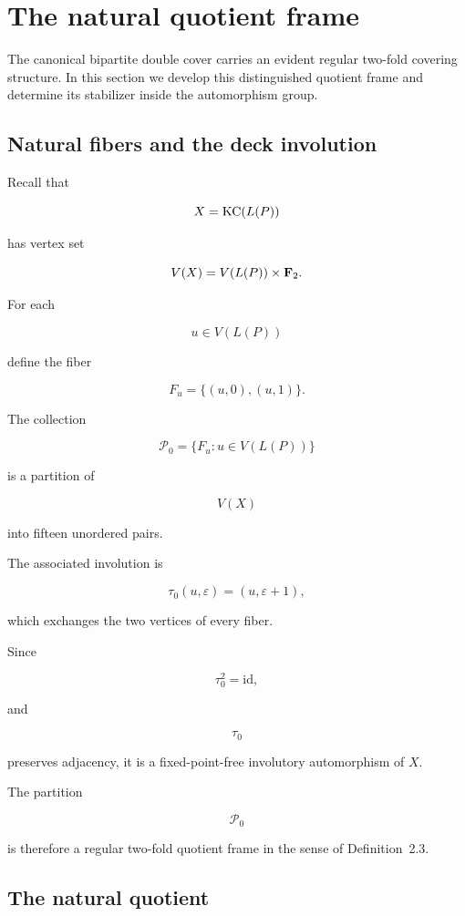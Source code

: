 \section{The natural quotient frame}

The canonical bipartite double cover carries an evident regular two-fold
covering structure. In this section we develop this distinguished quotient
frame and determine its stabilizer inside the automorphism group.

\subsection{Natural fibers and the deck involution}

Recall that

\[
X=\operatorname{KC}(L(P))
\]

has vertex set

\[
V(X)
=
V(L(P))\times\mathbf F_2.
\]

For each

\[
u\in V(L(P))
\]

define the fiber

\[
F_u
=
\{
(u,0),
(u,1)
\}.
\]

The collection

\[
\mathcal P_0
=
\{
F_u
:
u\in V(L(P))
\}
\]

is a partition of

\[
V(X)
\]

into fifteen unordered pairs.

The associated involution is

\[
\tau_0(u,\varepsilon)
=
(u,\varepsilon+1),
\]

which exchanges the two vertices of every fiber.

Since

\[
\tau_0^2=\mathrm{id},
\]

and

\[
\tau_0
\]

preserves adjacency, it is a fixed-point-free involutory automorphism of
\(X\).

The partition

\[
\mathcal P_0
\]

is therefore a regular two-fold quotient frame in the sense of
Definition~2.3.


\subsection{The natural quotient}

